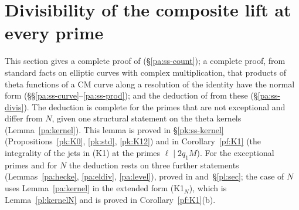 \documentclass[10pt]{amsart}
\theoremstyle{definition}
\theoremstyle{remark}
\begin{document}
\section{Divisibility of the composite lift at every prime}\label{pa:sec}

This section gives a complete proof of {\cite[Proposition~14.10]{P46}} (\S\ref{pa:ss-count}); a
complete proof, from standard facts on elliptic curves with complex multiplication, that products of
theta functions of a CM curve along a resolution of the identity have the normal form
{\cite[(44)]{P46}} (\S\S\ref{pa:ss-curve}--\ref{pa:ss-prod}); and the deduction of
{\cite[Proposition~14.20]{P46}} from these (\S\ref{pa:ss-divis}). The deduction is complete for the
primes that are not exceptional and differ from $N$, given one structural statement on the
theta kernels (Lemma~\ref{pa:kernel}). This lemma is proved in \S\ref{pk:ss-kernel}
(Propositions~\ref{pk:K0}, \ref{pk:std}, \ref{pk:K12}) and in Corollary~\ref{pf:K1} (the integrality of the
jets in (K1) at the primes $\ell\mid2q_1M$). For the exceptional primes
and for $N$ the deduction rests on three further statements
(Lemmas~\ref{pa:hecke}, \ref{pa:eldiv}, \ref{pa:level}), proved in {\cite[\S\S2 and~3]{P50}} and~\S\ref{pl:sec}; the case of $N$ uses Lemma~\ref{pa:kernel} in the extended form (K1$_N$), which
is Lemma~\ref{pl:kernelN} and is proved in Corollary~\ref{pf:K1}(b).
\end{document}
